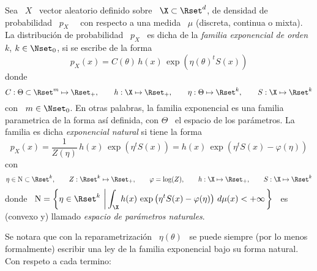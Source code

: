 \begin{definicion}\label{Def:MP:FamiliaExponencial}
%
  Sea  \ $X$  \  vector aleatorio  definido  sobre \  $\X  \subset \Rset^d$,  de
  densidad  de probabilidad  \  $p_X$ \  \ con  respecto  a una  medida \  $\mu$
  (discreta, continua o  mixta). La distribuci\'on de probabilidad  \ $p_X$ \ es
  dicha de  la {\em familia  exponencial de orden  $k$}, $k \in \Nset_0$,  si se
  escribe de la forma
  \[
  p_X(x) = C(\theta) \, h(x) \, \exp\left( \eta(\theta)^t S(x) \right)
  \]
  donde
  \[
  C:  \Theta \subset  \Rset^m \mapsto  \Rset_+,  \qquad h:  \X \mapsto  \Rset_+,
  \qquad \eta: \Theta \mapsto \Rset^k, \qquad S: \X \mapsto \Rset^k
  \]
  con  \ $m  \in \Nset_0$.   En otras  palabras, la  familia exponencial  es una
  familia parametrica de  la forma as\'i definida, con $\Theta$  \ el espacio de
  los par\'ametros.  La familia es dicha  {\em exponencial natural}  si tiene la
  forma
  \[
  p_X(x) = \frac{1}{Z(\eta)}  \, h(x) \, \exp\left( \eta^t  S(x) \right) = h(x)
  \, \exp\left( \eta^t S(x) - \varphi(\eta) \right)
  \]
  con
  \[
  \eta \in \mathrm{N} \subset \Rset^k, \qquad Z: \Rset^k \mapsto \Rset_+, \qquad
  \varphi = \log(Z), \qquad h: \X \mapsto \Rset_+, \qquad S: \X \mapsto \Rset^k
  \]
  donde  \ $\displaystyle \mathrm{N}  = \left\{  \eta \in  \Rset^k \,  \left| \,
      \int_\X h(x) \, \exp\left( \eta^t  S(x) - \varphi(\eta) \right) \, d\mu(x)
      < +  \infty \right.  \right\}$ \  es (convexo y)  llamado {\em  espacio de
    par\'ametros naturales}.
\end{definicion}
%
Se notara  que con  la reparametrizaci\'on \  $\eta(\theta)$ \ se  puede siempre
(por lo  menos formalmente) escribir una  ley de la familia  exponencial bajo su
forma natural. Con respeto a cada termino:
%
